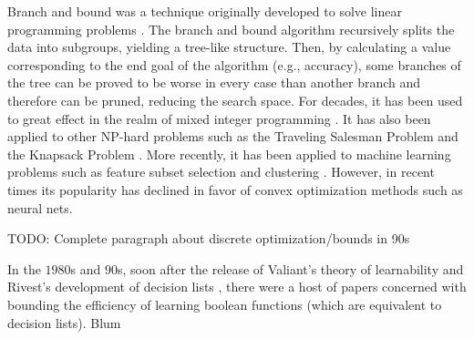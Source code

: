 Branch and bound was a technique originally developed to solve linear programming problems \cite{LandDo60}.
The branch and bound algorithm recursively splits the data into subgroups, yielding a tree-like structure.
Then, by calculating a value corresponding to the end goal of the algorithm (e.g., accuracy), some branches of the tree can be proved to be worse in every case than another branch and therefore can be pruned, reducing the search space.
For decades, it has been used to great effect in the realm of mixed integer programming \cite{LinderothSa99}.
It has also been applied to other NP-hard problems such as the Traveling Salesman Problem \cite{LittleMuSwKa63} and the Knapsack Problem \cite{Kolesar67}.
More recently, it has been applied to machine learning problems such as feature subset selection \cite{NarendraFu77} and clustering \cite{NarendraFu75}.
However, in recent times its popularity has declined in favor of convex optimization methods such as neural nets.

TODO: Complete paragraph about discrete optimization/bounds in 90s

In the $1980$s and $90$s, soon after the release of Valiant's theory of learnability \cite{Valiant84} and Rivest's development of decision lists \cite{Rivest87}, there were a host of papers concerned with bounding the efficiency of learning boolean functions (which are equivalent to decision lists).
Blum \cite{Blum90}
\cite{DhagatHe94}